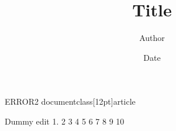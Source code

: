 ERROR2 documentclass[12pt]{article}
\usepackage[utf8]{inputenc}
\usepackage{graphicx}
\graphicspath{{figures/}{../figures/}}

\title{Title}
\author{Author}
\date{Date}



\maketitle

Dummy edit 1. 2 3 4 5 6 7 8 9 10











